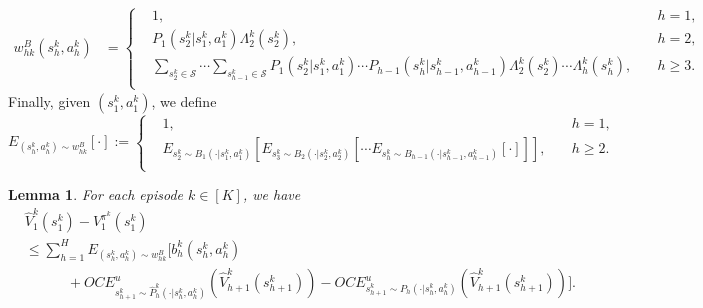 \documentclass[11pt]{article}
\newtheorem{lemma}{Lemma}
\newcommand{\1}{\mathbbm{1}}
\begin{document}
\begin{equation}\label{SKEY}
\begin{aligned}
w_{hk}^{B}(s_h^k,a_h^k)
	&=\left\{
	\begin{aligned}
	&1, \quad &h=1,\\
	&P_{1}(s_{2}^k\vert s_1^k,a_1^k)\Lambda_2^k(s_2^k), \quad &h=2,\\
	&\sum_{s_{2}^k\in \mathcal{S}}\cdots \sum_{s_{h-1}^k\in \mathcal{S}}P_{1}(s_{2}^k\vert s_1^k,a_1^k)\cdots P_{h-1}(s_{h}^k\vert s_{h-1}^k,a_{h-1}^k)\Lambda_2^k(s_2^k)\cdots \Lambda_h^k(s_h^k), \quad &h\geq 3.\\
	\end{aligned}
	\right
	.
\end{aligned}
\end{equation}
Finally, given $(s_1^k ,a_1^k)$, we define
\begin{equation}\label{LS10}
E_{(s_h^k,a_h^k)\sim w_{hk}^{B}}[\cdot] :=\left\{
	\begin{aligned}
	&1, \quad &h=1, \\
	&E_{s_2^k\sim B_1(\cdot\vert s_1^k,a_1^k)}\left [E_{s_3^k\sim B_2(\cdot\vert s_2^k,a_2^k)}\left [\cdots E_{s_h^k\sim B_{h-1}(\cdot\vert s_{h-1}^k,a_{h-1}^k)}\left [\cdot\right ]\right ]\right ], \quad &h\geq 2. \\
	\end{aligned}
	\right
	.
\end{equation}

\begin{lemma}\label{L7}
For each episode $k\in [K]$, we have
\begin{align} \label{eq:sim-lemma}
&\hat{V}_1^k(s_1^k)-V_1^{\pi^k}(s_1^k)\\
&\leq \sum_{h=1}^H E_{(s_h^k,a_h^k)\sim w_{hk}^{B}}\Big [b^k_h(s_h^k,a_h^k)\\
&\quad \quad \quad +OCE^u_{s_{h+1}^k\sim \hat{P}^k_h(\cdot\vert s_h^k,a_h^k)}(\hat{V}_{h+1}^k(s_{h+1}^k))-OCE^u_{s_{h+1}^k\sim P_h(\cdot\vert s_h^k,a_h^k)}(\hat{V}_{h+1}^k(s_{h+1}^k))\Big ]. \nonumber
\end{align}
\end{lemma}
\end{document}
